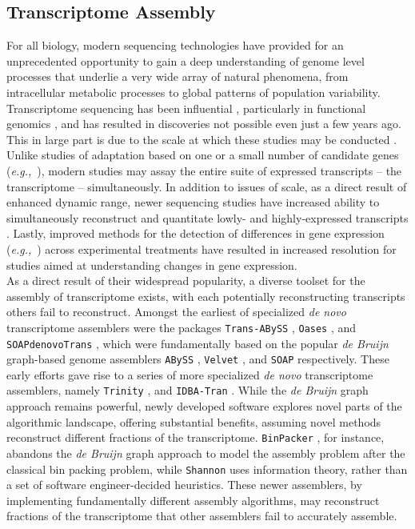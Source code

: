 \documentclass[10.5pt]{article}
\newcommand{\eg}{\textit{e.g.,}}
\newcommand{\tit}{\textit}
\begin{document}
{\subsection*{Transcriptome Assembly}
For all biology, modern sequencing technologies have provided for an unprecedented opportunity to gain a deep understanding of genome level processes that underlie a very wide array of natural phenomena, from intracellular metabolic processes to global patterns of population variability. Transcriptome sequencing has been influential \citep{Mortazavi:2008jj,Wang:2009di}, particularly in functional genomics \citep{Lappalainen:2013el,Cahoy:2008hm}, and has resulted in discoveries not possible even just a few years ago. This in large part is due to the scale at which these studies may be conducted \citep{Li:2017bq, Tan:2017ix}. Unlike studies of adaptation based on one or a small number of candidate genes (\eg\ \citep{Fitzpatrick:2005vd,Panhuis:2006kp}), modern studies may assay the entire suite of expressed transcripts -- the transcriptome -- simultaneously. In addition to issues of scale, as a direct result of enhanced dynamic range, newer sequencing studies have increased ability to simultaneously reconstruct and quantitate lowly- and highly-expressed transcripts \citep{Wolf:2013hd,Vijay:2012gy}. Lastly, improved methods for the detection of differences in gene expression (\eg\ \citep{Robinson:2010cw,Love:2014cf}) across experimental treatments have resulted in increased resolution for studies aimed at understanding changes in gene expression.    \\

As a direct result of their widespread popularity, a diverse toolset for the assembly of transcriptome exists, with each potentially reconstructing transcripts others fail to reconstruct. Amongst the earliest of specialized \tit{de novo} transcriptome assemblers were the packages \texttt{Trans-ABySS} \citep{Robertson:2010ih}, \texttt{Oases} \citep{Schulz:2012je}, and \texttt{SOAPdenovoTrans} \citep{Xie:2013wu}, which were fundamentally based on the popular \tit{de Bruijn} graph-based genome assemblers \texttt{ABySS} \citep{Simpson:2009iv}, \texttt{Velvet} \citep{Zerbino:2008bm}, and \texttt{SOAP} \cite{Li:2008in} respectively. These early efforts gave rise to a series of more specialized \tit{de novo} transcriptome assemblers, namely \texttt{Trinity} \citep{Haas:2013jq}, and \texttt{IDBA-Tran} \citep{Peng:2013eu}. While the \tit{de Bruijn} graph approach remains powerful, newly developed software explores novel parts of the algorithmic landscape, offering substantial benefits, assuming novel methods reconstruct different fractions of the transcriptome. \texttt{BinPacker} \citep{Liu:2016hh}, for instance, abandons the \tit{de Bruijn} graph approach to model the assembly problem after the classical bin packing problem, while \texttt{Shannon} \citep{Kannan:2016be} uses information theory, rather than a set of software engineer-decided heuristics. These newer assemblers, by implementing fundamentally different assembly algorithms, may reconstruct  fractions of the transcriptome that other assemblers fail to accurately assemble. 

}
\end{document}
